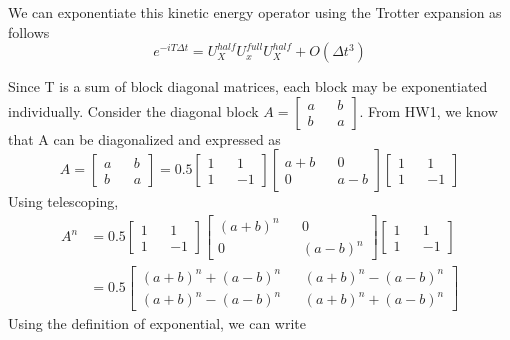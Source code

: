 \documentclass[11pt, oneside]{article}   	%
\begin{document}
We can exponentiate this kinetic energy operator using the Trotter expansion as follows
\begin{equation}
 e^{-iT \Delta t} = U_X^{half} U_x^{full} U_X^{half} + O(\Delta t^3)
\end{equation}

Since T is a sum of block diagonal matrices, each block may be exponentiated individually.
Consider the diagonal block $A = \begin{bmatrix}
a && b \\
b && a
\end{bmatrix}$. From HW1, we know that  A can be diagonalized and expressed as
\begin{equation}
A = \begin{bmatrix}
a && b \\
b && a
\end{bmatrix} = 0.5 \begin{bmatrix}
1 && 1 \\
1 && -1
\end{bmatrix} \begin{bmatrix}
a+b && 0 \\
0 && a-b
\end{bmatrix} \begin{bmatrix}
1 && 1 \\
1 && -1
\end{bmatrix}
\end{equation}
Using telescoping,
\begin{align}
A^n &= 0.5 \begin{bmatrix}
1 && 1 \\
1 && -1
\end{bmatrix} \begin{bmatrix}
(a+b)^n && 0 \\
0 && (a-b)^n
\end{bmatrix} \begin{bmatrix}
1 && 1 \\
1 && -1
\end{bmatrix} \\
&= 0.5\begin{bmatrix}
(a+b)^n + (a-b)^n && (a+b)^n - (a-b)^n \\
(a+b)^n - (a-b)^n && (a+b)^n + (a-b)^n
\end{bmatrix}



\end{align}
Using the definition of exponential, we can write
\end{document}
